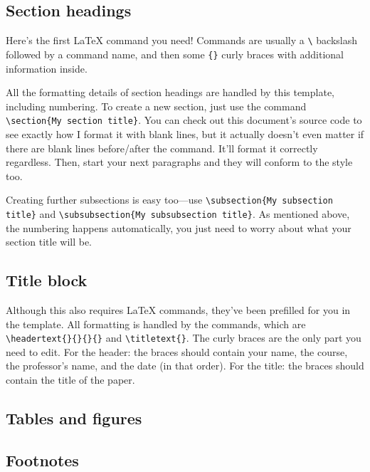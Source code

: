 \documentclass[12pt]{article}
\newcommand{\titletext}[1]
{\begin{center}
		\textbf{#1}
\end{center}}
\newcommand{\headertext}[4]
{\begin{flushleft}
		#1
		\\ #2
		\\ #3
		\\ #4
\end{flushleft}}
\begin{document}
	\subsection{Section headings} 
	Here's the first LaTeX command you need! Commands are usually a \verb|\| backslash followed by a command name, and then some \verb|{}| curly braces with additional information inside. 
	
	All the formatting details of section headings are handled by this template, including numbering. To create a new section, just use the command \verb|\section{My section title}|. You can check out this document's source code to see exactly how I format it with blank lines, but it actually doesn't even matter if there are blank lines before/after the command. It'll format it correctly regardless. Then, start your next paragraphs and they will conform to the style too.
	
	Creating further subsections is easy too---use \verb|\subsection{My subsection title}| and \verb|\subsubsection{My subsubsection title}|. As mentioned above, the numbering happens automatically, you just need to worry about what your section title will be.
	
	\subsection{Title block}
	Although this also requires LaTeX commands, they've been prefilled for you in the template. All formatting is handled by the commands, which are \verb|\headertext{}{}{}{}| and \verb|\titletext{}|. The curly braces are the only part you need to edit. For the header: the braces should contain your name, the course, the professor's name, and the date (in that order). For the title: the braces should contain the title of the paper.
	
	\subsection{Tables and figures}
	
	\subsection{Footnotes}
\end{document}
